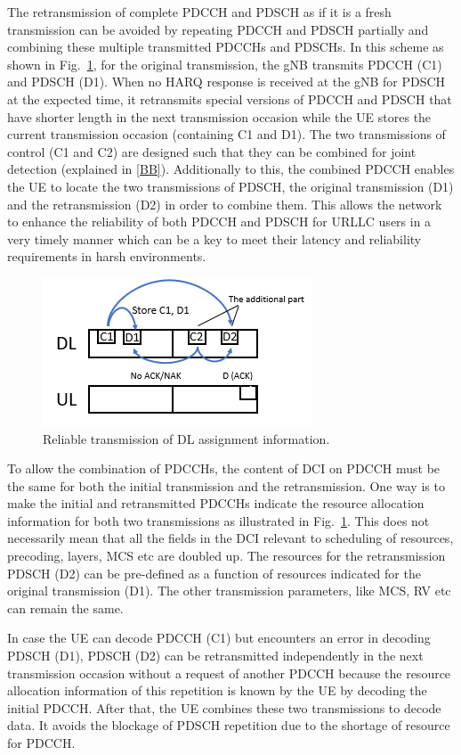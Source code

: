 \documentclass[conference]{IEEEtran}
\begin{document}
The retransmission of complete PDCCH and PDSCH as if it is a fresh transmission can be avoided by repeating PDCCH and PDSCH partially and combining these multiple transmitted PDCCHs and PDSCHs. In this scheme as shown in Fig.~\ref{fig1}, for the original transmission, the gNB transmits PDCCH (C1) and PDSCH (D1). When no HARQ response is received at the gNB for PDSCH at the expected time, it retransmits special versions of PDCCH and PDSCH that have shorter length in the next transmission occasion while the UE stores the current transmission occasion (containing C1 and D1). The two transmissions of control (C1 and C2) are designed such that they can be combined for joint detection (explained in \ref{BB}). Additionally to this, the combined PDCCH enables the UE to locate the two transmissions of PDSCH, the original transmission (D1) and the retransmission (D2) in order to combine them. This allows the network to enhance the reliability of both PDCCH and PDSCH for URLLC users in a very timely manner which can be a key to meet their latency and reliability requirements in harsh environments. 

\begin{figure}[htbp]
\centerline{\includegraphics[scale=0.7]{fig1.png}}
\caption{Reliable transmission of DL assignment information.}
\label{fig1}
\end{figure}

To allow the combination of PDCCHs, the content of DCI on PDCCH must be the same for both the initial transmission and the retransmission. One way is to make the initial and retransmitted PDCCHs indicate the resource allocation information for both two transmissions as illustrated in Fig.~\ref{fig1}. This does not necessarily mean that all the fields in the DCI relevant to scheduling of resources, precoding, layers, MCS etc are doubled up. The resources for the retransmission PDSCH (D2) can be pre-defined as a function of resources indicated for the original transmission (D1). The other transmission parameters, like MCS, RV etc can remain the same.

In case the UE can decode PDCCH (C1) but encounters an error in decoding PDSCH (D1), PDSCH (D2) can be retransmitted independently in the next transmission occasion without a request of another PDCCH because the resource allocation information of this repetition is known by the UE by decoding the initial PDCCH. After that, the UE combines these two transmissions to decode data. It avoids the blockage of PDSCH repetition due to the shortage of resource for PDCCH. 
\end{document}
